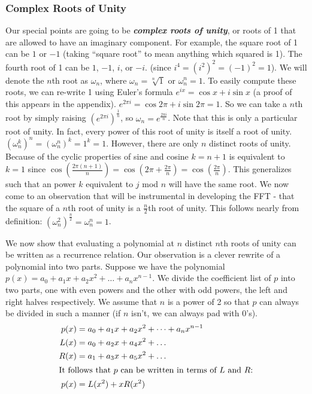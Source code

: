 \documentclass[11pt, oneside]{article}
\newcommand{\emphasis}[1]{\textbf{\textit{#1}}}
\theoremstyle{plain}
\theoremstyle{definition}
\begin{document}
\subsubsection{Complex Roots of Unity}
Our special points are going to be \emphasis{complex roots of unity},
or roots of 1 that are allowed to have an imaginary component.
For example, the square root of 1 can be \( 1 \) or \( -1 \)
(taking \enquote{square root} to mean anything which squared is 1).
The fourth root of 1 can be \( 1 \), \( -1 \), \( i \), or \( -i \).
(since \( i^4 = (i^2)^2 = (-1)^2 = 1 \)). We will denote the \( n \)th root as 
\( \omega_n \), where \( \omega_n = \sqrt[n]{1} \) or \( \omega^n_n = 1 \).
To easily compute these roots, we can re-write 1 using Euler's formula
\( e^{ix} = \cos x + i \sin x \) (a proof of this appears in the appendix).
\( e^{2 \pi i} = \cos 2 \pi + i \sin 2 \pi = 1 \).
So we can take a \( n \)th root by simply raising
\( (e^{2 \pi i})^{\frac{1}{n}} \), so \( \omega_n = e^{\frac{2 \pi i}{n}} \).
Note that this is only a particular root of unity.
In fact, every power of this root of unity is itself a root of unity.
\( (\omega^k_n)^n = (\omega^n_n)^k = 1^k = 1 \).
However, there are only \( n \) distinct roots of unity.
Because of the cyclic properties of sine and cosine \( k = n + 1 \)
is equivalent to \( k = 1 \) since \( \cos(\frac{2 \pi(n + 1)}{n}) =
\cos(2 \pi + \frac{2 \pi}{n}) = \cos(\frac{2 \pi}{n}) \).
This generalizes such that an power \( k \) equivalent to \( j \) mod \( n \)
will have the same root.
We now come to an observation that will be instrumental in developing
the FFT - that the square of a \( n \)th root of unity is a \( \frac{n}{2} \)th
root of unity. This follows nearly from definition:
\( (\omega_n^2)^{\frac{n}{2}} = \omega^n_n = 1 \).

We now show that evaluating a polynomial at \( n \) distinct \( n \)th roots of
unity can be written as a recurrence relation. Our observation is a clever
rewrite of a polynomial into two parts. Suppose we have the polynomial
\( p(x) = a_0 + a_1 x + a_2 x^2 + \dots + a_n x^{n - 1} \). We divide the
coefficient list of \( p \) into two parts,
one with even powers and the other with odd powers,
the left and right halves respectively.
We assume that \( n \) is a power of 2 so that \( p \) can always be divided
in such a manner (if \( n \) isn't, we can always pad with 0's).
\begin{align}
  p(x) &= a_0 + a_1 x + a_2 x^2 + \dots + a_n x^{n - 1} \\
  L(x) &= a_0 + a_2 x + a_4 x^2 + \dots \\
  R(x) &= a_1 + a_3 x + a_5 x^2 + \dots \\
  \shortintertext{It follows that \( p \) can be written
  in terms of \( L \) and \( R \):}
  p(x) &= L(x^2) + x R(x^2) \label{eq:recurrence} 
\end{align}
\end{document}
